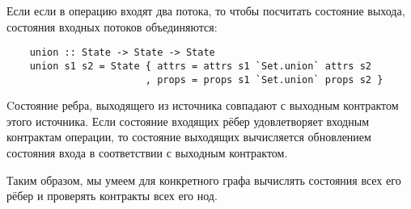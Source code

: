 Если если в операцию входят два потока, то чтобы посчитать состояние выхода, состояния входных потоков объединяются:

\begin{lstlisting}
    union :: State -> State -> State
    union s1 s2 = State { attrs = attrs s1 `Set.union` attrs s2
                        , props = props s1 `Set.union` props s2 }
\end{lstlisting}

Cостояние ребра, выходящего из источника совпадают с выходным контрактом этого источника. Если состояние входящих рёбер удовлетворяет входным контрактам операции, то состояние выходящих вычисляется обновлением состояния входа в соответствии с выходным контрактом.

Таким образом, мы умеем для конкретного графа вычислять состояния всех его рёбер и проверять контракты всех его нод.
